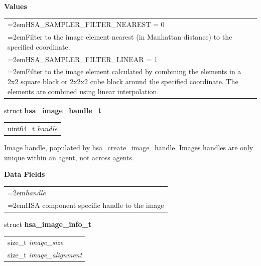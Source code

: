 \documentclass{book}
\newcommand{\hsaarg}[1]{\textit{#1}}
\newcommand{\hsadef}[2]{\hypertarget{#1}{\textbf{#2}}}
\newcommand{\hsatyp}[2]{\hypertarget{#1}{#2}}
\begin{document}
\begin{appendices}
\noindent\textbf{Values}\\[-5mm]
\begin{longtable}{@{}>{\hangindent=2em}p{\linewidth}}
HSA\_SAMPLER\_FILTER\_NEAREST = 0\\\hspace{2em}Filter to the image element nearest (in Manhattan distance) to the specified coordinate.\\[2mm]
HSA\_SAMPLER\_FILTER\_LINEAR = 1\\\hspace{2em}Filter to the image element calculated by combining the elements in a 2x2 square block or 2x2x2 cube block around the specified coordinate. The elements are combined using linear interpolation.
\end{longtable}

\noindent\begin{tcolorbox}[breakable,nobeforeafter,arc=0mm,colframe=white,colback=lightgray,left=0mm]
struct \hsadef{group__images_1ga0aeecea8e818df4cec2eccb3a5e85d5f}{hsa\_image\_handle\_t}
\vspace{-3.5mm}\begin{longtable}{@{}p{\textwidth}}
\hspace{1.7em}uint64\_t \hsaarg{handle}
\end{longtable}

\end{tcolorbox}
Image handle, populated by \hsatyp{group__images_1gaebf197189d4748950631148d12be38cb}{hsa\_create\_image\_handle}. Images handles are only unique within an agent, not across agents.

\noindent\textbf{Data Fields}\\[-5mm]
\begin{longtable}{@{}>{\hangindent=2em}p{\textwidth}}
\hsaarg{handle}\\\hspace{2em}HSA component specific handle to the image
\end{longtable}



\noindent\begin{tcolorbox}[breakable,nobeforeafter,arc=0mm,colframe=white,colback=lightgray,left=0mm]
struct \hsadef{group__images_1ga8b226310d50050b6a9ad73c91ee6eca2}{hsa\_image\_info\_t}
\vspace{-3.5mm}\begin{longtable}{@{}p{\textwidth}}
\hspace{1.7em}size\_t \hsaarg{image\_size}\\
\hspace{1.7em}size\_t \hsaarg{image\_alignment}
\end{longtable}


\end{tcolorbox}
\end{appendices}
\end{document}
